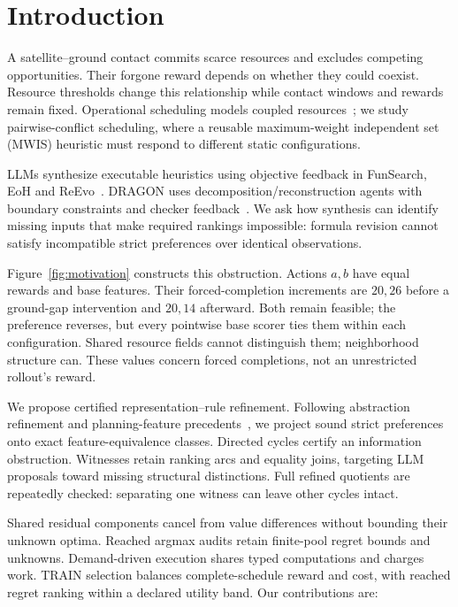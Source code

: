 \section{Introduction}
\label{sec:introduction}

A satellite--ground contact commits scarce resources and excludes competing
opportunities. Their forgone reward depends on whether they could coexist.
Resource thresholds change this relationship while contact windows and
rewards remain fixed. Operational scheduling models coupled
resources~\cite{augenstein2016optimal,levinson2025optimal,picard2021constellations}; we study
pairwise-conflict scheduling, where a reusable maximum-weight independent
set (MWIS) heuristic must respond to different static configurations.

LLMs synthesize executable heuristics using objective feedback in
FunSearch, EoH and ReEvo~\cite{romeraparedes2024funsearch,liu2024eoh,ye2024reevo}.
DRAGON uses decomposition/reconstruction agents with boundary constraints
and checker feedback~\cite{chen2026dragon}. We ask how synthesis can identify
missing inputs that make required rankings impossible: formula revision
cannot satisfy incompatible strict preferences over identical observations.

Figure~\ref{fig:motivation} constructs this obstruction. Actions $a,b$ have
equal rewards and base features. Their forced-completion increments are
$20,26$ before a ground-gap intervention and $20,14$ afterward. Both remain
feasible; the preference reverses, but every pointwise base scorer ties them
within each configuration. Shared resource fields cannot distinguish them;
neighborhood structure can. These values concern forced completions, not
an unrestricted rollout's reward.

We propose certified representation--rule refinement. Following abstraction
refinement and planning-feature precedents~\cite{clarke2000cegar,frances2021policies},
we project sound strict preferences onto exact feature-equivalence classes.
Directed cycles certify an information obstruction. Witnesses retain
ranking arcs and equality joins, targeting LLM proposals toward missing
structural distinctions. Full refined quotients are repeatedly checked:
separating one witness can leave other cycles intact.

Shared residual components cancel from value differences without bounding
their unknown optima. Reached argmax audits retain finite-pool regret bounds
and unknowns.
Demand-driven execution shares typed computations and charges work.
TRAIN selection balances complete-schedule reward and cost, with reached
regret ranking within a declared utility band. Our contributions are:


